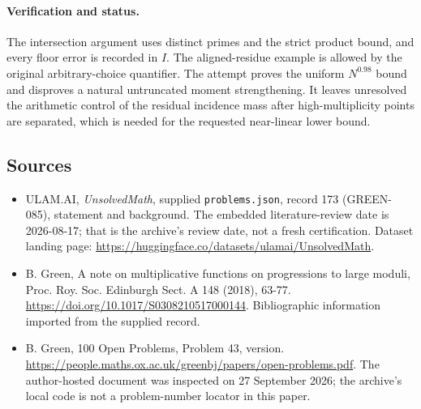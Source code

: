 \documentclass[11pt,a4paper]{article}
\begin{document}
\paragraph{Verification and status.}
The intersection argument uses distinct primes and the strict product bound, and every floor error is recorded in $I$. The aligned-residue example is allowed by the original arbitrary-choice quantifier. The attempt proves the uniform $N^{0.98}$ bound and disproves a natural untruncated moment strengthening. It leaves unresolved the arithmetic control of the residual incidence mass after high-multiplicity points are separated, which is needed for the requested near-linear lower bound.

\subsection{Sources}

{\small

\begin{itemize}

\item[\hypertarget{source:173:1}{S1}] ULAM.AI, \emph{UnsolvedMath}, supplied \texttt{problems.json}, record 173 (GREEN-085), statement and background. The embedded literature-review date is 2026-08-17; that is the archive’s review date, not a fresh certification. Dataset landing page: \url{https://huggingface.co/datasets/ulamai/UnsolvedMath}.

\item[\hypertarget{source:173:2}{S2}] B. Green, A note on multiplicative functions on progressions to large moduli, Proc. Roy. Soc. Edinburgh Sect. A 148 (2018), 63-77. \url{https://doi.org/10.1017/S0308210517000144}. Bibliographic information imported from the supplied record.

\item[\hypertarget{source:173:3}{S3}] B. Green, 100 Open Problems, Problem 43, version. \url{https://people.maths.ox.ac.uk/greenbj/papers/open-problems.pdf}. The author-hosted document was inspected on 27 September 2026; the archive’s local code is not a problem-number locator in this paper.

\end{itemize}

}

\label{end:173}
\end{document}
